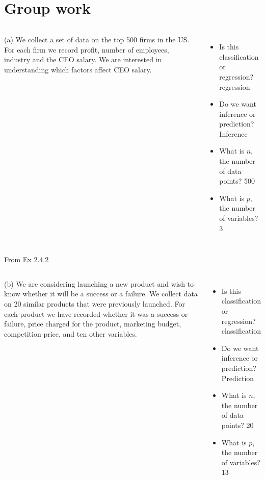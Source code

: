 \documentclass[aspectratio=169,dvipsnames]{beamer}
\newcommand{\InstructorNotes}[1]{{\color{orange}#1}}
\newcommand{\bvfill}{\vskip0pt plus 1filll}
\begin{document}
\section{Group work}
{
\begin{frame}
\begin{columns}
(a) We collect a set of data on the top 500 firms in the US. For each
firm we record profit, number of employees, industry and the
CEO salary. We are interested in understanding which factors
aﬀect CEO salary.

\begin{itemize}
	\item Is this classification or regression? 
	\InstructorNotes{regression}
	\item Do we want inference or prediction?
	\InstructorNotes{Inference}
	\item What is $n$, the number of data points?
	\InstructorNotes{500}
	\item What is $p$, the number of variables?
	\InstructorNotes{3}
\end{itemize}
\end{columns}

	\InstructorNotes{From Ex 2.4.2}
\end{frame}

\begin{frame}
\begin{columns}
(b) We are considering launching a new product and wish to know
whether it will be a success or a failure. We collect data on 20
similar products that were previously launched. For each product we have recorded whether it was a success or failure, price
charged for the product, marketing budget, competition price,
and ten other variables.
\begin{itemize}
	\item Is this classification or regression?
	\InstructorNotes{classification}
	\item Do we want inference or prediction?
	\InstructorNotes{Prediction}
	\item What is $n$, the number of data points?
	\InstructorNotes{20}
	\item What is $p$, the number of variables?
	\InstructorNotes{13}
\end{itemize}
\end{columns}

\end{frame}
}
\end{document}
